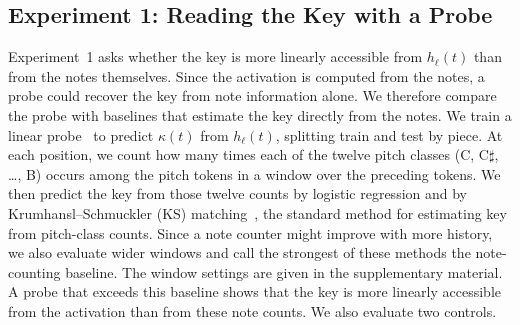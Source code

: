 \documentclass{article}
\begin{document}
\subsection{Experiment 1: Reading the Key with a Probe}
\label{sec:exp1}
Experiment~1 asks whether the key is more linearly accessible from $h_\ell(t)$ than from the notes themselves.
Since the activation is computed from the notes, a probe could recover the key from note information alone.
We therefore compare the probe with baselines that estimate the key directly from the notes.
We train a linear probe~\cite{alain2017probes,belinkov2022probing} to predict $\kappa(t)$ from $h_\ell(t)$, splitting train and test by piece.
At each position, we count how many times each of the twelve pitch classes (C, C$\sharp$, \dots, B) occurs among the pitch tokens in a window over the preceding tokens.
We then predict the key from those twelve counts by logistic regression and by Krumhansl--Schmuckler (KS) matching~\cite{krumhansl1982,krumhansl1990,temperley1999ks}, the standard method for estimating key from pitch-class counts.
Since a note counter might improve with more history, we also evaluate wider windows and call the strongest of these methods the note-counting baseline.
The window settings are given in the supplementary material.
A probe that exceeds this baseline shows that the key is more linearly accessible from the activation than from these note counts.
We also evaluate two controls.
\end{document}
